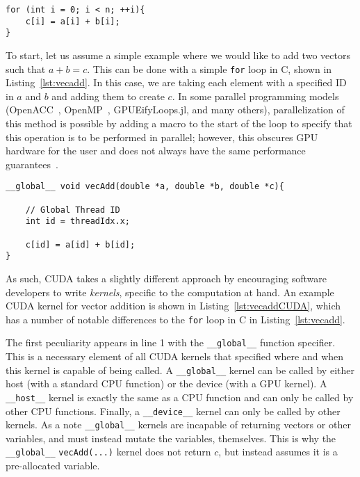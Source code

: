 \begin{lstlisting}[float,label=lst:vecadd,caption={An example of vector addition performed in C or C++ for $a$, $b$, and $c$, all of size $n$},style=c++]
for (int i = 0; i < n; ++i){
    c[i] = a[i] + b[i];
}
\end{lstlisting}

To start, let us assume a simple example where we would like to add two vectors such that $a + b = c$.
This can be done with a simple \texttt{for} loop in C, shown in Listing~\ref{lst:vecadd}.
In this case, we are taking each element with a specified ID  in $a$ and $b$ and adding them to create $c$.
In some parallel programming models (OpenACC~\cite{wienke2012}, OpenMP~\cite{chandra2001}, GPUEifyLoops.jl, and many others), parallelization of this method is possible by adding a macro to the start of the loop to specify that this operation is to be performed in parallel; however, this obscures GPU hardware for the user and does not always have the same performance guarantees~\cite{reyes2012}.

\begin{lstlisting}[float,label=lst:vecaddCUDA, style=c++,caption=An example of a vector addition kernel in CUDA]
__global__ void vecAdd(double *a, double *b, double *c){

    // Global Thread ID
    int id = threadIdx.x;

    c[id] = a[id] + b[id];
}
\end{lstlisting}

As such, CUDA takes a slightly different approach by encouraging software developers to write \textit{kernels}, specific to the computation at hand.
An example CUDA kernel for vector addition is shown in Listing~\ref{lst:vecaddCUDA}, which has a number of notable differences to the \texttt{for} loop in C in Listing~\ref{lst:vecadd}.

The first peculiarity appears in line 1 with the \texttt{\_\_global\_\_} function specifier.
This is a necessary element of all CUDA kernels that specified where and when this kernel is capable of being called.
A \texttt{\_\_global\_\_} kernel can be called by either host (with a standard CPU function) or the device (with a GPU kernel).
A \texttt{\_\_host\_\_} kernel is exactly the same as a CPU function and can only be called by other CPU functions.
Finally, a \texttt{\_\_device\_\_} kernel can only be called by other kernels.
As a note \texttt{\_\_global\_\_} kernels are incapable of returning vectors or other variables, and must instead mutate the variables, themselves.
This is why the \texttt{\_\_global\_\_} \texttt{vecAdd(...)} kernel does not return $c$, but instead assumes it is a pre-allocated variable.

